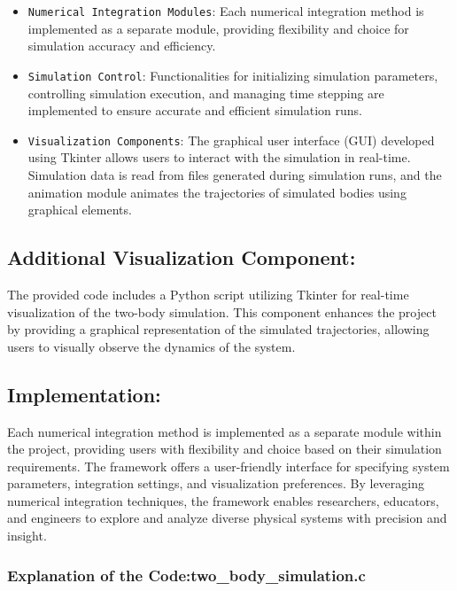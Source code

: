 \documentclass{article}
\begin{document}
\begin{itemize}[label=-]
    \item \texttt{Numerical Integration Modules}: Each numerical integration method is implemented as a separate module, providing flexibility and choice for simulation accuracy and efficiency.
    \item \texttt{Simulation Control}: Functionalities for initializing simulation parameters, controlling simulation execution, and managing time stepping are implemented to ensure accurate and efficient simulation runs.
    \item \texttt{Visualization Components}: The graphical user interface (GUI) developed using Tkinter allows users to interact with the simulation in real-time. Simulation data is read from files generated during simulation runs, and the animation module animates the trajectories of simulated bodies using graphical elements.
\end{itemize}

\subsection*{Additional Visualization Component:}
The provided code includes a Python script utilizing Tkinter for real-time visualization of the two-body simulation. This component enhances the project by providing a graphical representation of the simulated trajectories, allowing users to visually observe the dynamics of the system.





\subsection*{Implementation:}
Each numerical integration method is implemented as a separate module within the project, providing users with flexibility and choice based on their simulation requirements. The framework offers a user-friendly interface for specifying system parameters, integration settings, and visualization preferences. By leveraging numerical integration techniques, the framework enables researchers, educators, and engineers to explore and analyze diverse physical systems with precision and insight.

\subsubsection*{Explanation of the Code:two_body_simulation.c}
\end{document}
